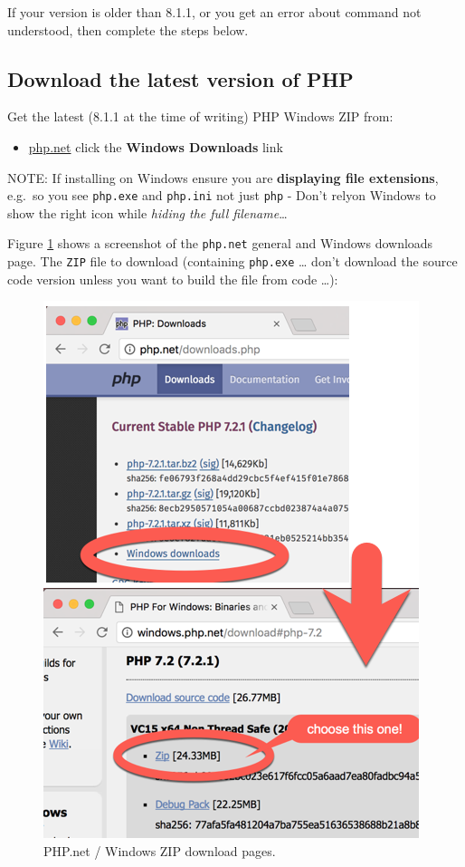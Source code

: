 \documentclass[a4paperpaper,openright]{book}
\providecommand{\tightlist}{%
  \setlength{\itemsep}{0pt}\setlength{\parskip}{0pt}}
\begin{document}
If your version is older than 8.1.1, or you get an error about command
not understood, then complete the steps below.

\hypertarget{download-the-latest-version-of-php}{%
\subsection{Download the latest version of
PHP}\label{download-the-latest-version-of-php}}

Get the latest (8.1.1 at the time of writing) PHP Windows ZIP from:

\begin{itemize}
\tightlist
\item
  \href{http://php.net/downloads.php}{php.net} click the \textbf{Windows
  Downloads} link
\end{itemize}

NOTE: If installing on Windows ensure you are \textbf{displaying file
extensions}, e.g.~so you see \texttt{php.exe} and \texttt{php.ini} not
just \texttt{php} - Don't relyon Windows to show the right icon while
\emph{hiding the full filename}\ldots{}

Figure \ref{windows_zip} shows a screenshot of the \texttt{php.net}
general and Windows downloads page. The \texttt{ZIP} file to download
(containing \texttt{php.exe} \ldots{} don't download the source code
version unless you want to build the file from code \ldots{}):

\begin{figure}
\centering
\includegraphics{./tex2pdf.-56818c273b0f887e/54ea2bd7518c42f7055083e08168bc8498c402b7.png}
\caption{PHP.net / Windows ZIP download pages. \label{windows_zip}}
\end{figure}
\end{document}
